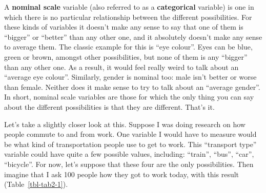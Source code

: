 \documentclass[
  a4paper,
]{book}
\begin{document}
A \textbf{nominal scale} variable (also referred to as a
\textbf{categorical} variable) is one in which there is no particular
relationship between the different possibilities. For these kinds of
variables it doesn't make any sense to say that one of them is
``bigger'' or ``better'' than any other one, and it absolutely doesn't
make any sense to average them. The classic example for this is ``eye
colour''. Eyes can be blue, green or brown, amongst other possibilities,
but none of them is any ``bigger'' than any other one. As a result, it
would feel really weird to talk about an ``average eye colour''.
Similarly, gender is nominal too: male isn't better or worse than
female. Neither does it make sense to try to talk about an ``average
gender''. In short, nominal scale variables are those for which the only
thing you can say about the different possibilities is that they are
different. That's it.

Let's take a slightly closer look at this. Suppose I was doing research
on how people commute to and from work. One variable I would have to
measure would be what kind of transportation people use to get to work.
This ``transport type'' variable could have quite a few possible values,
including: ``train'', ``bus'', ``car'', ``bicycle''. For now, let's
suppose that these four are the only possibilities. Then imagine that I
ask 100 people how they got to work today, with this result
(Table~\ref{tbl-tab2-1}).

\hypertarget{tbl-tab2-1}{}
 
  \providecommand{\huxb}[2]{\arrayrulecolor[RGB]{#1}\global\arrayrulewidth=#2pt}
  \providecommand{\huxvb}[2]{\color[RGB]{#1}\vrule width #2pt}
  \providecommand{\huxtpad}[1]{\rule{0pt}{#1}}
  \providecommand{\huxbpad}[1]{\rule[-#1]{0pt}{#1}}
\end{document}
